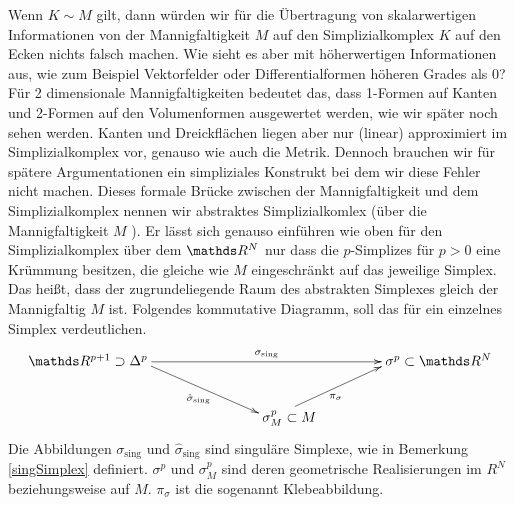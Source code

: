     \begin{bemerkung}
      Wenn \( K \sim M \) gilt, dann würden wir für die Übertragung von skalarwertigen Informationen von der Mannigfaltigkeit
      \( M \) auf den Simplizialkomplex \( K \) auf den Ecken nichts falsch machen.
      Wie sieht es aber mit höherwertigen Informationen aus, wie zum Beispiel Vektorfelder oder Differentialformen höheren Grades als 0? Für 2 dimensionale Mannigfaltigkeiten bedeutet das, dass 1-Formen auf Kanten und 2-Formen auf den Volumenformen ausgewertet werden, wie wir später noch sehen werden. 
      Kanten und Dreickflächen liegen aber nur (linear) approximiert im Simplizialkomplex vor, genauso wie auch die Metrik.
      Dennoch brauchen wir für spätere Argumentationen ein simpliziales Konstrukt bei dem wir diese Fehler nicht machen.
      Dieses formale Brücke zwischen der Mannigfaltigkeit und dem Simplizialkomplex nennen wir abstraktes Simplizialkomlex (über die Mannigfaltigkeit \( M \) ). 
      Er lässt sich genauso einführen wie oben für den Simplizialkomplex über dem \( \R^{N} \) 
      nur dass die \(p\)-Simplizes für \( p > 0 \) eine Krümmung besitzen, die gleiche wie \( M \) eingeschränkt auf das jeweilige Simplex.
      Das heißt, dass der zugrundeliegende Raum des abstrakten Simplexes gleich der Mannigfaltig \( M \) ist.
      Folgendes kommutative Diagramm, soll das für ein einzelnes Simplex verdeutlichen.
      \begin{align}
        \begin{xy}
          \xymatrix{
            **[l] \R^{p+1} \supset \Delta^{p} \ar[rr]^{\sigma_{\text{sing}}} \ar[rd]_{\hat{\sigma}_{\text{sing}}} 
            & & **[r] \sigma^{p} \subset \R^{N} \\
                                       & **[r] \sigma^{p}_{M}\subset M \ar[ru]_{\pi_{\sigma}}&
          }
        \end{xy}
      \end{align}
      Die Abbildungen \( \sigma_{\text{sing}} \) und \( \hat{\sigma}_{\text{sing}} \) sind singuläre Simplexe, wie in
      Bemerkung \ref{singSimplex} definiert. \( \sigma^{p} \) und \( \sigma^{p}_{M} \) sind deren geometrische Realisierungen im \( R^{N} \) beziehungsweise auf \( M \).
      \( \pi_{\sigma} \) ist die sogenannt Klebeabbildung. 

    \end{bemerkung}


